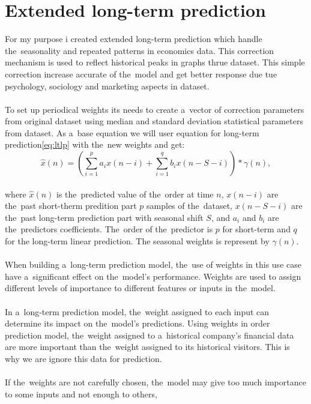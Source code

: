     \section{Extended long-term prediction}\label{sec:extlonglp}
    For my purpose i created extended long-term prediction which handle the~seasonality and repeated patterns
    in economics data. This correction mechanism is used to reflect historical peaks in graphs thrue dataset.
    This simple correction increase accurate of the~model and get better response due tue psychology,
    sociology and marketing aspects in dataset.\\
    \\
    To set up periodical weights its needs to create a~vector of correction parameters from original dataset using
    median and standard deviation statistical parameters from dataset. As a~base equation we will user equation
    for long-term prediction\ref{eq:ltlp} with the~new weights and get:
    \begin{equation} \label{eq:eltlp}
        \hat{x}(n) = \left(\sum_{i=1}^{p} a_i x(n-i) + \sum_{i=1}^{q} b_i x(n-S-i)\right) * \gamma(n),
    \end{equation}
    \\
    where $\hat{x}(n)$ is the~predicted value of the~order at time $n$, $x(n-i)$ are the~past short-therm predition part $p$ samples of the~dataset, $x(n-S-i)$ are the~past long-term prediction part with seasonal shift $S$, and $a_i$ and $b_i$ are the~predictors coefficients. The~order of the~predictor is $p$ for short-term and $q$ for the long-term linear prediction. The seasonal weights is represent by $\gamma(n)$.\\
    \\
    When building a~long-term prediction model, the~use of weights in this use case have a~significant effect on
    the~model's performance. Weights are used to assign different levels of importance to different
    features or inputs in the~model.\\
    \\
    In a~long-term prediction model, the~weight assigned to each input can determine its impact on the~model's predictions.
    Using weights in order prediction model, the~weight assigned to a~historical company's financial data are more important
    than the~weight assigned to its historical visitors. This is why we are ignore this data for prediction.\\
    \\
    If the~weights are not carefully chosen, the~model may give too much importance to some inputs and not enough to others,
